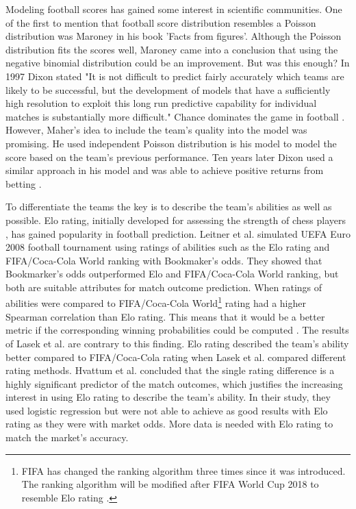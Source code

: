 Modeling football scores has gained some interest in scientific communities. One of the first to mention that football score distribution resembles a Poisson distribution was Maroney \cite{moroney1962facts} in his book 'Facts from figures'. Although the Poisson distribution fits the scores well, Maroney came into a conclusion that using the negative binomial distribution could be an improvement. But was this enough? In 1997 Dixon stated \cite{dixon1997} "It is not difficult to predict fairly accurately which teams are likely to be successful, but the development of models that have a sufficiently high resolution to exploit this long run predictive capability for individual matches is substantially more difficult." Chance dominates the game in football \cite{ben2006parity}. However, Maher's \cite{maher1982modelling} idea to include the team's quality into the model was promising. He used independent Poisson distribution is his model to model the score based on the team's previous performance. Ten years later Dixon used a similar approach in his model and was able to achieve positive returns from betting \cite{dixon1997}.

To differentiate the teams the key is to describe the team's abilities as well as possible. Elo rating, initially developed for assessing the strength of chess players \cite{elo1978rating}, has gained popularity in football prediction. Leitner et al.\cite{leitner2010forecasting} simulated UEFA Euro 2008 football tournament using ratings of abilities such as the Elo rating and FIFA/Coca-Cola World ranking with Bookmaker's odds. They showed that Bookmarker's odds outperformed Elo and FIFA/Coca-Cola World ranking, but both are suitable attributes for match outcome prediction. When ratings of abilities were compared to FIFA/Coca-Cola World\footnote{FIFA has changed the ranking algorithm three times since it was introduced. The ranking algorithm will be modified after FIFA World Cup 2018 to resemble Elo rating \cite{wiki:fifarating}.} rating had a higher Spearman correlation than Elo rating. This means that it would be a better metric if the corresponding winning probabilities could be computed \cite{leitner2010forecasting}. The results of Lasek et al. \cite{lasek2013predictive} are contrary to this finding. Elo rating described the team's ability better compared to FIFA/Coca-Cola rating when Lasek et al.  compared different rating methods. Hvattum et al. \cite{hvattum2010using} concluded that the single rating difference is a highly significant predictor of the match outcomes, which justifies the increasing interest in using Elo rating to describe the team's ability. In their study, they used logistic regression but were not able to achieve as good results with Elo rating as they were with market odds. More data is needed with Elo rating to match the market's accuracy.

